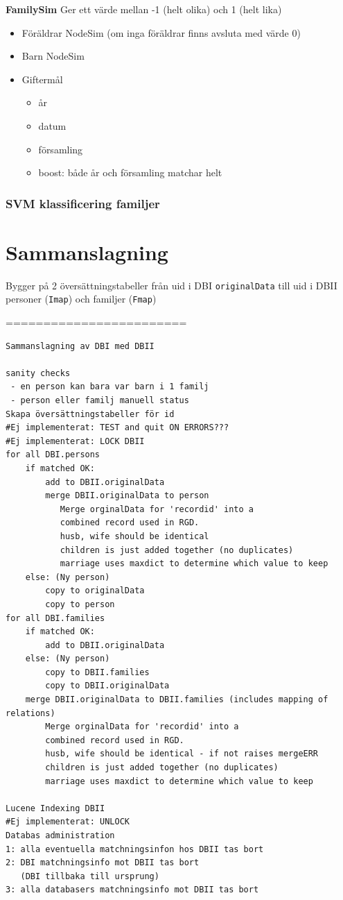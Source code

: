 \documentclass[swedish,11pt]{article}
\begin{document}
{\bf FamilySim} Ger ett värde mellan -1 (helt olika) och 1 (helt lika)\\
\begin{itemize}
\item Föräldrar NodeSim (om inga föräldrar finns avsluta med värde 0)
\item Barn NodeSim
\item Giftermål
\begin{itemize}
\item år
\item datum
\item församling
\item boost: både år och församling matchar helt
\end{itemize}
\end{itemize}

\subsubsection{SVM klassificering familjer}\label{famsvm}

\section{Sammanslagning}
\label{merge}
Bygger på 2 översättningstabeller från uid i DBI \verb+originalData+ till uid i DBII\\
personer ({\tt Imap}) och familjer ({\tt Fmap})

========================
\begin{verbatim}
Sammanslagning av DBI med DBII

sanity checks
 - en person kan bara var barn i 1 familj
 - person eller familj manuell status
Skapa översättningstabeller för id
#Ej implementerat: TEST and quit ON ERRORS???
#Ej implementerat: LOCK DBII
for all DBI.persons
    if matched OK:
        add to DBII.originalData
        merge DBII.originalData to person
           Merge orginalData for 'recordid' into a
           combined record used in RGD.
           husb, wife should be identical
           children is just added together (no duplicates)
           marriage uses maxdict to determine which value to keep
    else: (Ny person)
        copy to originalData
        copy to person
for all DBI.families
    if matched OK:
        add to DBII.originalData
    else: (Ny person)
        copy to DBII.families
        copy to DBII.originalData
    merge DBII.originalData to DBII.families (includes mapping of relations)
        Merge orginalData for 'recordid' into a
        combined record used in RGD.
        husb, wife should be identical - if not raises mergeERR
        children is just added together (no duplicates)
        marriage uses maxdict to determine which value to keep

Lucene Indexing DBII
#Ej implementerat: UNLOCK
Databas administration
1: alla eventuella matchningsinfon hos DBII tas bort
2: DBI matchningsinfo mot DBII tas bort
   (DBI tillbaka till ursprung)
3: alla databasers matchningsinfo mot DBII tas bort
\end{verbatim}
\end{document}
